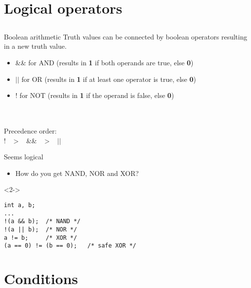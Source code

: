 \section{Logical operators}
\subsection{}
\begin{frame}{Boolean arithmetic}
	Truth values can be connected by boolean operators resulting in a new truth value.
	\begin{itemize}
		\item \&\& for AND (results in \textbf{1} if both operands are true, else \textbf{0})
		\item $||$ for OR (results in \textbf{1} if at least one operator is true, else \textbf{0})
		\item ! for NOT (results in \textbf{1} if the operand is false, else \textbf{0})
	\end{itemize}
	\ \\\ \\Precedence order:\\
	\centering
	! \ $>$ \ \&\& \ $>$ \ $||$ 
\end{frame}
\begin{frame}[fragile]{Seems logical}
	\begin{itemize}
		\item How do you get NAND, NOR and XOR?
	\end{itemize}
	\begin{uncoverenv}<2->
		\begin{lstlisting}[numbers=none]
int a, b;
...
!(a && b);	/* NAND */
!(a || b);	/* NOR */
a != b;		/* XOR */
(a == 0) != (b == 0);	/* safe XOR */
\end{lstlisting}
	\end{uncoverenv}
\end{frame}

\section{Conditions}
